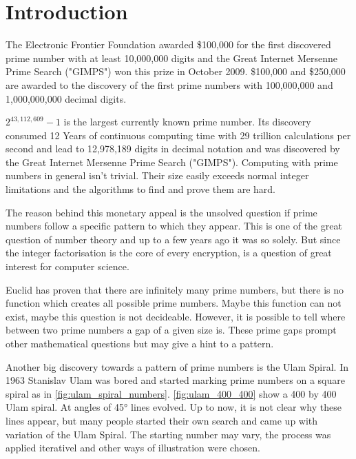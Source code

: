 \section{Introduction}
\label{sec:intro}

The Electronic Frontier Foundation awarded \$100,000 for the first discovered prime number with at least 10,000,000 digits and the Great Internet Mersenne Prime Search ("GIMPS") won this prize in October 2009. \$100,000 and \$250,000 are awarded to the discovery of the first prime numbers with 100,000,000 and 1,000,000,000 decimal digits.

$2^{43,112,609}-1$ is the largest currently known prime number. Its discovery consumed 12 Years of continuous computing time with 29 trillion calculations per second and lead to 12,978,189 digits in decimal notation and was discovered by the Great Internet Mersenne Prime Search ("GIMPS").
Computing with prime numbers in general isn't trivial. Their size easily exceeds normal integer limitations and the algorithms to find and prove them are hard.

The reason behind this monetary appeal is the unsolved question if prime numbers follow a specific pattern to which they appear. This is one of the great question of number theory and up to a few years ago it was so solely. But since the integer factorisation is the core of every encryption, is a question of great interest for computer science.  

Euclid has proven that there are infinitely many prime numbers, but there is no function which creates all possible prime numbers. Maybe this function can not exist, maybe this question is not decideable.\cite{zahlentheorie} However, it is possible to tell where between two prime numbers a gap of a given size is. These prime gaps prompt other mathematical questions but may give a hint to a pattern.

Another big discovery towards a pattern of prime numbers is the Ulam Spiral. In 1963 Stanislav Ulam was bored and started marking prime numbers on a square spiral as in \ref{fig:ulam_spiral_numbers}. \ref{fig:ulam_400_400} show a 400 by 400 Ulam spiral. At angles of 45° lines evolved. Up to now, it is not clear why these lines appear, but many people started their own search and came up with variation of the Ulam Spiral. The starting number may vary, the process was applied iterativel\cite{web} and other ways of illustration were chosen\cite{web}.


\begin{figure}[H]
\begin{minipage}[t]{0.475\textwidth}
\centering
\end{minipage}
\hfill
\begin{minipage}[t]{0.475\textwidth}
\centering
\end{minipage}
\end{figure}

